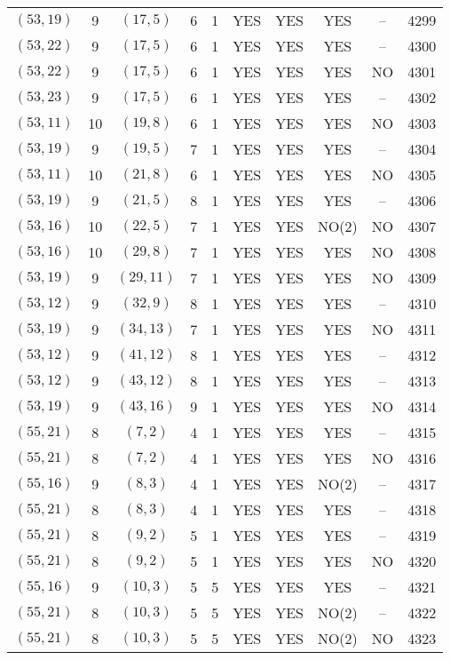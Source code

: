 \begin{longtable}{|c|c|c|c|c|c|c|c|c|c|}
$(53, 19)$ & 9 & $(17, 5)$ & 6 & 1 & YES & YES & YES & -- & 4299\\
$(53, 22)$ & 9 & $(17, 5)$ & 6 & 1 & YES & YES & YES & -- & 4300\\
$(53, 22)$ & 9 & $(17, 5)$ & 6 & 1 & YES & YES & YES & NO & 4301\\
$(53, 23)$ & 9 & $(17, 5)$ & 6 & 1 & YES & YES & YES & -- & 4302\\
$(53, 11)$ & 10 & $(19, 8)$ & 6 & 1 & YES & YES & YES & NO & 4303\\
$(53, 19)$ & 9 & $(19, 5)$ & 7 & 1 & YES & YES & YES & -- & 4304\\
$(53, 11)$ & 10 & $(21, 8)$ & 6 & 1 & YES & YES & YES & NO & 4305\\
$(53, 19)$ & 9 & $(21, 5)$ & 8 & 1 & YES & YES & YES & -- & 4306\\
$(53, 16)$ & 10 & $(22, 5)$ & 7 & 1 & YES & YES & NO(2) & NO & 4307\\
$(53, 16)$ & 10 & $(29, 8)$ & 7 & 1 & YES & YES & YES & NO & 4308\\
$(53, 19)$ & 9 & $(29, 11)$ & 7 & 1 & YES & YES & YES & NO & 4309\\
$(53, 12)$ & 9 & $(32, 9)$ & 8 & 1 & YES & YES & YES & -- & 4310\\
$(53, 19)$ & 9 & $(34, 13)$ & 7 & 1 & YES & YES & YES & NO & 4311\\
$(53, 12)$ & 9 & $(41, 12)$ & 8 & 1 & YES & YES & YES & -- & 4312\\
$(53, 12)$ & 9 & $(43, 12)$ & 8 & 1 & YES & YES & YES & -- & 4313\\
$(53, 19)$ & 9 & $(43, 16)$ & 9 & 1 & YES & YES & YES & NO & 4314\\
$(55, 21)$ & 8 & $(7, 2)$ & 4 & 1 & YES & YES & YES & -- & 4315\\
$(55, 21)$ & 8 & $(7, 2)$ & 4 & 1 & YES & YES & YES & NO & 4316\\
$(55, 16)$ & 9 & $(8, 3)$ & 4 & 1 & YES & YES & NO(2) & -- & 4317\\
$(55, 21)$ & 8 & $(8, 3)$ & 4 & 1 & YES & YES & YES & -- & 4318\\
$(55, 21)$ & 8 & $(9, 2)$ & 5 & 1 & YES & YES & YES & -- & 4319\\
$(55, 21)$ & 8 & $(9, 2)$ & 5 & 1 & YES & YES & YES & NO & 4320\\
$(55, 16)$ & 9 & $(10, 3)$ & 5 & 5 & YES & YES & YES & -- & 4321\\
$(55, 21)$ & 8 & $(10, 3)$ & 5 & 5 & YES & YES & NO(2) & -- & 4322\\
$(55, 21)$ & 8 & $(10, 3)$ & 5 & 5 & YES & YES & NO(2) & NO & 4323\\

\end{longtable}
